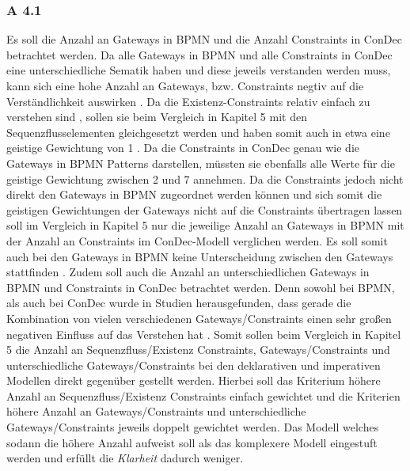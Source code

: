 \subsubsection{A 4.1}
Es soll die Anzahl an Gateways in BPMN und die Anzahl Constraints in ConDec betrachtet werden. Da alle Gateways in BPMN und alle Constraints in ConDec eine unterschiedliche Sematik haben und diese jeweils verstanden werden muss, kann sich eine hohe Anzahl an Gateways, bzw. Constraints negtiv auf die Verständlichkeit auswirken \cite{gruhn2006adopting, thesis_maja}. \newline
Da die Existenz-Constraints relativ einfach zu verstehen sind \cite{thesis_maja}, sollen sie beim Vergleich in Kapitel 5 mit den Sequenzflusselementen gleichgesetzt werden und haben somit auch in etwa eine geistige Gewichtung von 1 \cite{thesis_maja,haisjackl2014understanding, gruhn2006adopting}. \newline
Da die Constraints in ConDec genau wie die Gateways in BPMN Patterns darstellen, müssten sie ebenfalls alle Werte für die geistige Gewichtung zwischen 2 und 7 annehmen. Da die Constraints jedoch nicht direkt den Gateways in BPMN zugeordnet werden können und sich somit die geistigen Gewichtungen der Gateways nicht auf die Constraints übertragen lassen soll im Vergleich in Kapitel 5 nur die jeweilige Anzahl an Gateways in BPMN mit der Anzahl an Constraints im ConDec-Modell verglichen werden. Es soll somit auch bei den Gateways in BPMN keine Unterscheidung zwischen den Gateways stattfinden \cite{thesis_maja,haisjackl2014understanding, gruhn2006adopting}. \newline
Zudem soll auch die Anzahl an unterschiedlichen Gateways in BPMN und Constraints in ConDec betrachtet werden. Denn sowohl bei BPMN, als auch bei ConDec wurde in Studien herausgefunden, dass gerade die Kombination von vielen verschiedenen Gateways/Constraints einen sehr großen negativen Einfluss auf das Verstehen hat \cite{gruhn2006adopting, thesis_maja,haisjackl2014understanding}. \newline
Somit sollen beim Vergleich in Kapitel 5 die Anzahl an Sequenzfluss/Existenz Constraints, Gateways/Constraints und unterschiedliche Gateways/Constraints bei den deklarativen und imperativen Modellen direkt gegenüber gestellt werden. Hierbei soll das Kriterium höhere Anzahl an Sequenzfluss/Existenz Constraints einfach gewichtet und die Kriterien höhere Anzahl an Gateways/Constraints und unterschiedliche Gateways/Constraints jeweils doppelt gewichtet werden. Das Modell welches sodann die höhere Anzahl aufweist soll als das komplexere Modell eingestuft werden und erfüllt die \textit{Klarheit} dadurch weniger.



